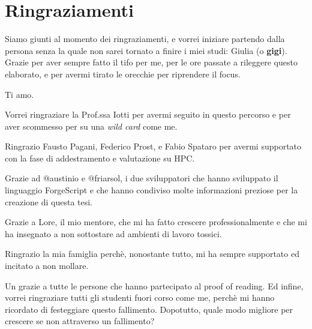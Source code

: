 \chapter*{Ringraziamenti}
Siamo giunti al momento dei ringraziamenti, e vorrei iniziare partendo dalla persona senza la quale non sarei tornato a finire i miei studi: Giulia (o \textbf{gigi}). Grazie per aver sempre fatto il tifo per me, per le ore passate a rileggere questo elaborato, e per avermi tirato le orecchie per riprendere il focus. 

Ti amo.

Vorrei ringraziare la Prof.ssa Iotti per avermi seguito in questo percorso e per aver scommesso per su una \textit{wild card} come me. 

Ringrazio  Fausto Pagani, Federico Prost, e Fabio Spataro per avermi supportato con la fase di addestramento e valutazione su HPC.

Grazie ad @austinio e @friarsol, i due sviluppatori che hanno sviluppato il linguaggio ForgeScript e che hanno condiviso molte informazioni preziose per la creazione di questa tesi.

Grazie a Lore, il mio mentore, che mi ha fatto crescere professionalmente e che mi ha insegnato a non sottostare ad ambienti di lavoro tossici.

Ringrazio la mia famiglia perchè, nonostante tutto, mi ha sempre supportato ed incitato a non mollare.

Un grazie a tutte le persone che hanno partecipato al proof of reading.
\newline
Ed infine, vorrei ringraziare tutti gli studenti fuori corso come me, perchè mi hanno ricordato di festeggiare questo fallimento. Dopotutto, quale modo migliore per crescere se non attraverso un fallimento?